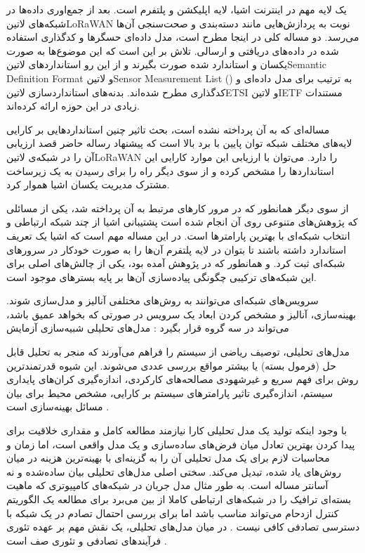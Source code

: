 
یک لایه مهم در اینترنت اشیا، لایه اپلیکشن و پلتفرم است. بعد از جمع‌اوری داده‌ها در شبکه‌های ‌لاتین{LoRaWAN} نوبت به پردازش‌هایی مانند دسته‌بندی و صحت‌سنجی
آن‌ها می‌رسد. دو مساله کلی در اینجا مطرح است،
مدل داده‌ای حسگرها و کدگذاری استفاده شده در داده‌های دریافتی و ارسالی.
تلاش بر این است که این موضوع‌ها به صورت یکسان و استاندارد شده صورت بگیرند و از این رو استانداردهای
‌لاتین{Semantic Definition Format} و ‌لاتین{Sensor Measurement List} ()
به ترتیب برای مدل داده‌ای و کدگذاری مطرح شده‌اند.
بدنه‌های استانداردسازی ‌لاتین{ETSI} و ‌لاتین{IETF} مستندات زیادی در این حوزه ارائه کرده‌اند.

مساله‌ای که به آن پرداخته نشده است، بحث تاثیر چنین استاندارد‌هایی بر کارایی لایه‌های مختلف شبکه توان پایین با برد بالا است که پیشنهاد رساله حاضر قصد ارزیابی آن را
در شبکه‌ی ‌لاتین{LoRaWAN} را دارد.
می‌توان با ارزیابی این موارد کارایی این استانداردها را مشخص کرده و از سوی دیگر راه را برای رسیدن به یک زیرساخت مشترک مدیریت یکسان اشیا هموار کرد.

از سوی دیگر همانطور که در مرور کارهای مرتبط به آن پرداخته شد،
یکی از مسائلی که پژوهش‌های متنوعی روی آن انجام شده است پشتیبانی اشیا از چند شبکه ارتباطی و انتخاب شبکه‌ای با بهترین
پارامترها است. در این مساله مهم است که اشیا یک تعریف استاندارد داشته باشند تا بتوان در لایه پلتفرم آن‌ها را به صورت خودکار در سرورهای شبکه‌ای ثبت کرد.
و همانطور که در پژوهش  آمده بود، یکی از چالش‌های اصلی برای این شبکه‌های ترکیبی چگونگی پیاده‌سازی آن‌ها بر پایه بسترهای موجود است.


سرویس‌های شبکه‌ای می‌توانند به روش‌های مختلفی آنالیز و مدل‌سازی شوند.
بهینه‌سازی، آنالیز و مشخص کردن ابعاد یک سرویس در صورتی که بخواهد عمیق باشد، می‌تواند در سه گروه قرار بگیرد
:
 مدل‌های تحلیلی
 شبیه‌سازی
 آزمایش

مدل‌های تحلیلی، توصیف ریاضی از سیستم را فراهم می‌آورند که منجر به تحلیل قابل حل (فرمول بسته) یا بیشتر مواقع بررسی عددی می‌شوند.
این شیوه قدرتمند‌ترین روش برای فهم سریع و غیرشهودی مصالحه‌های کارکردی، اندازه‌گیری کران‌های پایداری سیستم،
اندازه‌گیری تاثیر پارامترهای سیستم بر کارایی، مشخص محیط برای بیان مسائل بهینه‌سازی است
.

با وجود اینکه تولید یک مدل تحلیلی کارا نیازمند مطالعه کامل و مقداری خلاقیت برای پیدا کردن بهترین تعادل میان
فرض‌های ساده‌سازی و یک مدل واقعی است، اما زمان و محاسبات لازم برای یک مدل تحلیلی آن را به گزینه‌ای با بهینه‌ترین
هزینه در میان روش‌های یاد شده، تبدیل می‌کند.
سختی اصلی مدل‌های تحلیلی بیان ساده‌شده و نه آسانتر مساله است. به طور مثال مدل جریان در شبکه‌های کامپیوتری
که ماهیت بسته‌ای ترافیک را در شبکه‌های ارتباطی کاملا از بین می‌برد برای مطالعه یک الگوریتم کنترل ازدحام می‌تواند
مناسب باشد اما برای بررسی احتمال تصادم در یک شبکه با دسترسی تصادفی کافی نیست
.
در میان مدل‌های تحلیلی، یک نقش مهم بر عهده تئوری فرآیندهای تصادفی و تئوری صف است
.

